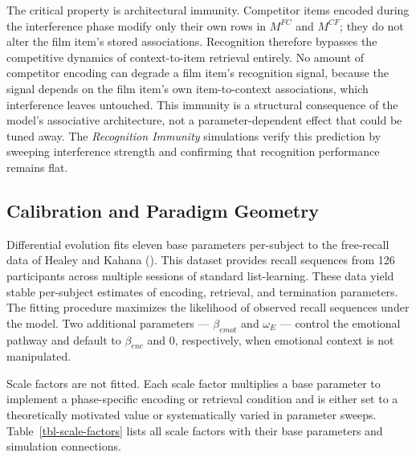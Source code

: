\documentclass[
  man,
  floatsintext,
  longtable,
  nolmodern,
  notxfonts,
  notimes,
  draftfirst,
  colorlinks=true,linkcolor=blue,citecolor=blue,urlcolor=blue]{apa7}
\begin{document}
The critical property is architectural immunity. Competitor items
encoded during the interference phase modify only their own rows in
\(M^{FC}\) and \(M^{CF}\); they do not alter the film item's stored
associations. Recognition therefore bypasses the competitive dynamics of
context-to-item retrieval entirely. No amount of competitor encoding can
degrade a film item's recognition signal, because the signal depends on
the film item's own item-to-context associations, which interference
leaves untouched. This immunity is a structural consequence of the
model's associative architecture, not a parameter-dependent effect that
could be tuned away. The \emph{Recognition Immunity} simulations verify
this prediction by sweeping interference strength and confirming that
recognition performance remains flat.

\subsection{Calibration and Paradigm
Geometry}\label{calibration-and-paradigm-geometry}

Differential evolution fits eleven base parameters per-subject to the
free-recall data of Healey and Kahana
(). This dataset provides recall
sequences from 126 participants across multiple sessions of standard
list-learning. These data yield stable per-subject estimates of
encoding, retrieval, and termination parameters. The fitting procedure
maximizes the likelihood of observed recall sequences under the model.
Two additional parameters --- \(\beta_{emot}\) and \(\omega_E\) ---
control the emotional pathway and default to \(\beta_{enc}\) and 0,
respectively, when emotional context is not manipulated.

Scale factors are not fitted. Each scale factor multiplies a base
parameter to implement a phase-specific encoding or retrieval condition
and is either set to a theoretically motivated value or systematically
varied in parameter sweeps. Table~\ref{tbl-scale-factors} lists all
scale factors with their base parameters and simulation connections.
\end{document}
